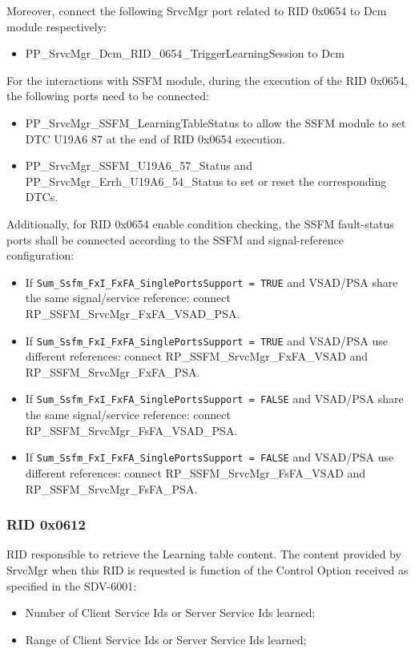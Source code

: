 Moreover, connect the following SrvcMgr port related to RID 0x0654 to Dcm module respectively:
 \begin{itemize}
    \item PP\_SrvcMgr\_Dcm\_RID\_0654\_TriggerLearningSession to Dcm
  \end{itemize}

For the interactions with SSFM module, during the execution of the RID 0x0654, the following ports need to be connected:
 \begin{itemize}
    \item PP\_SrvcMgr\_SSFM\_LearningTableStatus to allow the SSFM module to set DTC U19A6 87 at the end of RID 0x0654 execution.
    \item PP\_SrvcMgr\_SSFM\_U19A6\_57\_Status and PP\_SrvcMgr\_Errh\_U19A6\_54\_Status to set or reset the corresponding DTCs.
  \end{itemize}

Additionally, for RID 0x0654 enable condition checking, the SSFM fault-status ports shall be connected according to the SSFM and signal-reference configuration:
 \begin{itemize}
    \item If \texttt{Sum\_Ssfm\_FxI\_FxFA\_SinglePortsSupport = TRUE} and VSAD/PSA share the same signal/service reference: connect RP\_SSFM\_SrvcMgr\_FxFA\_VSAD\_PSA.
    \item If \texttt{Sum\_Ssfm\_FxI\_FxFA\_SinglePortsSupport = TRUE} and VSAD/PSA use different references: connect RP\_SSFM\_SrvcMgr\_FxFA\_VSAD and RP\_SSFM\_SrvcMgr\_FxFA\_PSA.
    \item If \texttt{Sum\_Ssfm\_FxI\_FxFA\_SinglePortsSupport = FALSE} and VSAD/PSA share the same signal/service reference: connect RP\_SSFM\_SrvcMgr\_FsFA\_VSAD\_PSA.
    \item If \texttt{Sum\_Ssfm\_FxI\_FxFA\_SinglePortsSupport = FALSE} and VSAD/PSA use different references: connect RP\_SSFM\_SrvcMgr\_FsFA\_VSAD and RP\_SSFM\_SrvcMgr\_FsFA\_PSA.
  \end{itemize}


\subsubsection{RID 0x0612}
\label{subsec:RIDs0x0612}
RID responsible to retrieve the Learning table content. The content provided by SrvcMgr when this RID is requested is function of the Control Option received as specified in the SDV-6001:
\begin{itemize}
\item Number of Client Service Ids or Server Service Ids learned;
\item Range of Client Service Ids or Server Service Ids learned;
\end{itemize}

